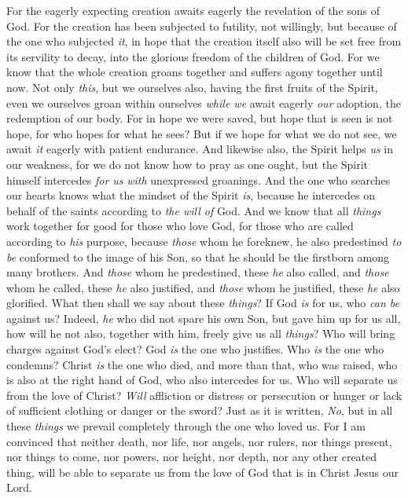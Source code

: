 \begin{biblechapter}
\verse For the eagerly expecting creation awaits eagerly the revelation of the sons of God.
\verse For the creation has been subjected to futility, not willingly, but because of the one who subjected \textit{it}, in hope
\verse that the creation itself also will be set free from its servility to decay, into the glorious freedom of the children of God.
\verse For we know that the whole creation groans together and suffers agony together until now.
\verse Not only \textit{this}, but we ourselves also, having the first fruits of the Spirit, even we ourselves groan within ourselves \textit{while we} await eagerly \textit{our} adoption, the redemption of our body.
\verse For in hope we were saved, but hope that is seen is not hope, for who hopes for what he sees?
\verse But if we hope for what we do not see, we await \textit{it} eagerly with patient endurance.
\verse And likewise also, the Spirit helps \textit{us} in our weakness, for we do not know how to pray as one ought, but the Spirit himself intercedes \textit{for us} \textit{with} unexpressed groanings.
\verse And the one who searches our hearts knows what the mindset of the Spirit \textit{is}, because he intercedes on behalf of the saints according to \textit{the will of} God.
\verse And we know that all \textit{things} work together for good for those who love God, for those who are called according to \textit{his} purpose,
\verse because \textit{those} whom he foreknew, he also predestined \textit{to be} conformed to the image of his Son, so that he should be the firstborn among many brothers.
\verse And \textit{those} whom he predestined, these \textit{he} also called, and \textit{those} whom he called, these \textit{he} also justified, and \textit{those} whom he justified, these \textit{he} also glorified.
 What then shall we say about these \textit{things}? If God \textit{is} for us, who \textit{can be} against us?
\verse Indeed, \textit{he} who did not spare his own Son, but gave him up for us all, how will he not also, together with him, freely give us all \textit{things}?
\verse Who will bring charges against God’s elect? God \textit{is} the one who justifies.
\verse Who \textit{is} the one who condemns? Christ \textit{is} the one who died, and more than that, who was raised, who is also at the right hand of God, who also intercedes for us.
\verse Who will separate us from the love of Christ? \textit{Will} affliction or distress or persecution or hunger or lack of sufficient clothing or danger or the sword?
\verse Just as it is written,
\verse \textit{No}, but in all these \textit{things} we prevail completely through the one who loved us.
\verse For I am convinced that neither death, nor life, nor angels, nor rulers, nor things present, nor things to come, nor powers,
\verse nor height, nor depth, nor any other created thing, will be able to separate us from the love of God that is in Christ Jesus our Lord.
\end{biblechapter}

